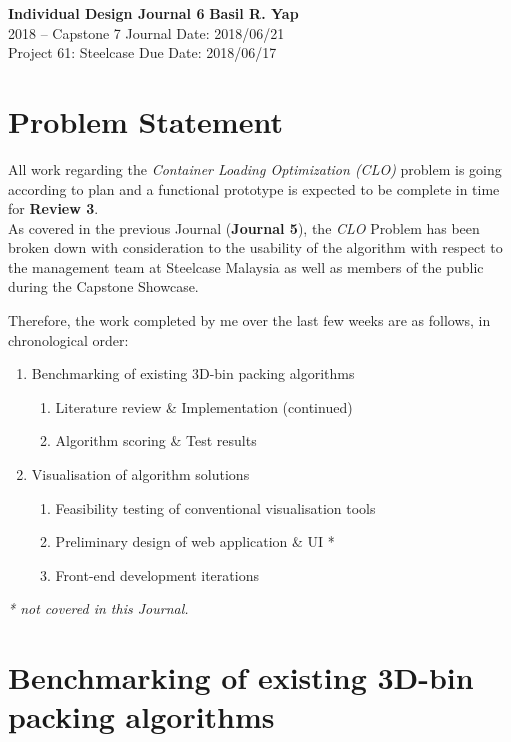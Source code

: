 \documentclass[a4paper, 11pt]{article}
\begin{document}
\noindent
\large\textbf{Individual Design Journal 6} \hfill \textbf{Basil R. Yap} \\
2018 -- Capstone 7 \hfill Journal Date: 2018/06/21 \\
Project 61: Steelcase \hfill Due Date: 2018/06/17

\section*{Problem Statement}

All work regarding the \textit{Container Loading Optimization (CLO)} problem is going according to plan and a functional prototype is expected to be complete in time for \textbf{Review 3}.\\

As covered in the previous Journal (\textbf{Journal 5}), the \textit{CLO} Problem has been broken down with consideration to the usability of the algorithm with respect to the management team at Steelcase Malaysia as well as members of the public during the Capstone Showcase.

Therefore, the work completed by me over the last few weeks are as follows, in chronological order:
\begin{enumerate}
\item Benchmarking of existing 3D-bin packing algorithms
\begin{enumerate}
\item Literature review \& Implementation (continued)
\item Algorithm scoring \& Test results
\end{enumerate}
\item Visualisation of algorithm solutions
\begin{enumerate}
\item Feasibility testing of conventional visualisation tools
\item Preliminary design of web application \& UI *
\item Front-end development iterations
\end{enumerate}
\end{enumerate}

\textit{* not covered in this Journal.}

\section*{Benchmarking of existing 3D-bin packing algorithms}
\end{document}
